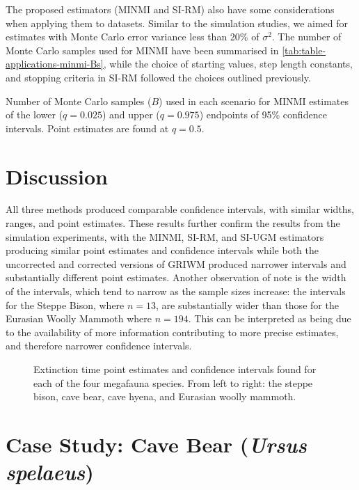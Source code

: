 The proposed estimators (MINMI and SI-RM) also have some considerations when applying them to datasets. Similar to the simulation studies, we aimed for estimates with Monte Carlo error variance less than 20\% of $\sigma^2$. The number of Monte Carlo samples used for MINMI have been summarised in \autoref{tab:table-applications-minmi-Bs}, while the choice of starting values, step length constants, and stopping criteria in SI-RM followed the choices outlined previously.
\begin{table}[ht]
    \centering
    \caption{Number of Monte Carlo samples ($B$) used in each scenario for MINMI estimates of the lower ($q=0.025$) and upper ($q=0.975$) endpoints of 95\% confidence intervals. Point estimates are found at $q = 0.5$.}
    \vspace{4mm}
    
    \label{tab:table-applications-minmi-Bs}
\end{table}

\section{Discussion}
All three methods produced comparable confidence intervals, with similar widths, ranges, and point estimates. These results further confirm the results from the simulation experiments, with the MINMI, SI-RM, and SI-UGM estimators producing similar point estimates and confidence intervals while both the uncorrected and corrected versions of GRIWM produced narrower intervals and substantially different point estimates. Another observation of note is the width of the intervals, which tend to narrow as the sample sizes increase: the intervals for the Steppe Bison, where $n = 13$, are substantially wider than those for the Eurasian Woolly Mammoth where $n = 194$. This can be interpreted as being due to the availability of more information contributing to more precise estimates, and therefore narrower confidence intervals.
\begin{figure}[ht]
    \centering
    
    \caption{Extinction time point estimates and confidence intervals found for each of the four megafauna species. From left to right: the steppe bison, cave bear, cave hyena, and Eurasian woolly mammoth.}
    \label{fig:applications-confidence-intervals}
\end{figure}

\section{Case Study: Cave Bear (\textit{Ursus spelaeus})}

